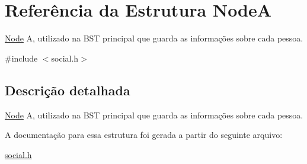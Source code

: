\hypertarget{structNodeA}{}\section{Referência da Estrutura NodeA}
\label{structNodeA}


\mbox{\hyperlink{structNode}{Node}} A, utilizado na B\+ST principal que guarda as informações sobre cada pessoa.  




{\ttfamily \#include $<$social.\+h$>$}



\subsection{Descrição detalhada}
\mbox{\hyperlink{structNode}{Node}} A, utilizado na B\+ST principal que guarda as informações sobre cada pessoa. 

A documentação para essa estrutura foi gerada a partir do seguinte arquivo\+:\begin{DoxyCompactItemize}
\item 
\mbox{\hyperlink{social_8h}{social.\+h}}\end{DoxyCompactItemize}
